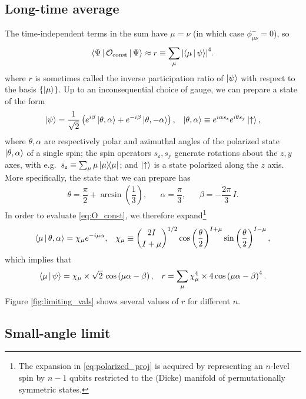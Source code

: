 \documentclass[nofootinbib,notitlepage,11pt]{revtex4-2}
\renewcommand{\t}{\text} %
\newcommand{\f}[2]{\dfrac{#1}{#2}} %
\newcommand{\p}[1]{\left(#1\right)} %
\renewcommand{\set}[1]{\left\{#1\right\}} %
\newcommand{\bk}{\Braket} %
\newcommand{\1}{\mathds{1}}
\newcommand{\up}{\uparrow}
\newcommand{\y}{\text{y}}
\newcommand{\z}{\text{z}}
\renewcommand{\O}{\mathcal{O}}
\begin{document}
\subsection{Long-time average}

The time-independent terms in the sum have $\mu=\nu$ (in which case
$\phi_{\mu\nu}^-=0$), so
\begin{align}
  \bk{\Psi|\O_{\t{const}}|\Psi}
  \approx r \equiv \sum_\mu \abs{\bk{\mu|\psi}}^4.
  \label{eq:O_const}
\end{align}
where $r$ is sometimes called the inverse participation ratio of
$\ket\psi$ with respect to the basis $\set{\ket\mu}$.  Up to an
inconsequential choice of gauge, we can prepare a state of the form
\begin{align}
  \ket\psi = \f1{\sqrt{2}}
  \p{e^{i\beta} \ket{\theta,\alpha}
    + e^{-i\beta} \ket{\theta,-\alpha}},
  &&
  \ket{\theta,\alpha} \equiv e^{i\alpha s_\z} e^{i\theta s_\y} \ket\up,
  \label{eq:double_state}
\end{align}
where $\theta,\alpha$ are respectively polar and azimuthal angles of
the polarized state $\ket{\theta,\alpha}$ of a single spin; the spin
operators $s_\z,s_\y$ generate rotations about the $z,y$ axes, with
e.g.~$s_\z\equiv\sum_\mu \mu\op\mu$; and $\ket\up$ is a state
polarized along the $z$ axis.  More specifically, the state that we
can prepare has
\begin{align}
  \theta = \f{\pi}{2} + \arcsin\p{\f13},
  &&
  \alpha = \f{\pi}{3},
  &&
  \beta = -\f{2\pi}{3}\, I.
\end{align}
In order to evaluate \eqref{eq:O_const}, we therefore
expand\footnote{The expansion in \eqref{eq:polarized_proj} is acquired
  by representing an $n$-level spin by $n-1$ qubits restricted to the
  (Dicke) manifold of permutationally symmetric states.}
\begin{align}
  \bk{\mu|\theta,\alpha} = \chi_\mu e^{-i\mu\alpha},
  &&
  \chi_\mu \equiv { 2I \choose I+\mu }^{1/2}
  \cos\p{\f{\theta}{2}}^{I+\mu} \sin\p{\f{\theta}{2}}^{I-\mu},
  \label{eq:polarized_proj}
\end{align}
which implies that
\begin{align}
  \bk{\mu|\psi} = \chi_\mu \times \sqrt{2}\, \cos\p{\mu\alpha-\beta},
  &&
  r = \sum_\mu \chi_\mu^4 \times 4 \cos\p{\mu\alpha-\beta}^4.
\end{align}
Figure \ref{fig:limiting_vals} shows several values of $r$ for different $n$.

\subsection{Small-angle limit}
\end{document}
